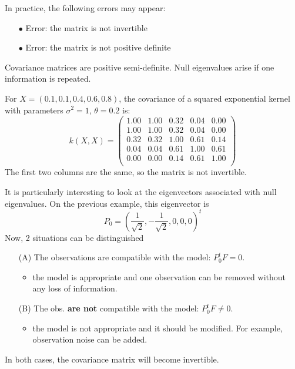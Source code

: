 \documentclass{beamer}
\begin{document}
\begin{frame}{}
In practice, the following errors may appear:\\
\begin{itemize}
	\item[\alert{$\bullet$}] \alert{Error: the matrix is not invertible}
	\item[\alert{$\bullet$}] \alert{Error: the matrix is not positive definite}
\end{itemize}
Covariance matrices are positive semi-definite. Null eigenvalues arise if one information is repeated.
\begin{example}
 For $X=(0.1,0.1,0.4,0.6,0.8)$, the covariance of a squared exponential kernel with parameters $\sigma^2=1$, $\theta = 0.2$ is: 
 \begin{equation*}
 k(X,X) = 
 \begin{pmatrix}
	1.00 & 1.00 & 0.32 & 0.04 & 0.00 \\
	1.00 & 1.00 & 0.32 & 0.04 & 0.00 \\
	0.32 & 0.32 & 1.00 & 0.61 & 0.14 \\
	0.04 & 0.04 & 0.61 & 1.00 & 0.61 \\
	0.00 & 0.00 & 0.14 & 0.61 & 1.00 \\
 \end{pmatrix}
 \end{equation*}
 The first two columns are the same, so the matrix is not invertible.
\end{example}
\end{frame}

\begin{frame}{}
It is particularly interesting to look at the eigenvectors associated with null eigenvalues. On the previous example, this eigenvector is 
\begin{equation*}
P_0 = \left( \frac{1}{\sqrt{2}},-\frac{1}{\sqrt{2}},0,0,0 \right)^t
\end{equation*}
Now, 2 situations can be distinguished\\ \vspace{2mm}
\begin{itemize}
	\item[(A)] The observations are compatible with the model: $P_0^t F = 0$.
	\begin{itemize}
		\item the model is appropriate and one observation can be removed without any loss of information.
	\end{itemize}
	\item[(B)] The obs. \textbf{are not} compatible with the model: $P_0^t F \neq 0$.
		\begin{itemize}
			\item the model is not appropriate and it should be modified. For example, observation noise can be added.
		\end{itemize}
\end{itemize}
In both cases, the covariance matrix will become invertible.
\end{frame}
\end{document}
